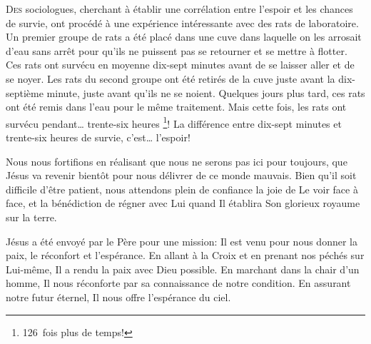 \dvrule







\lettrine{D}{es} sociologues, cherchant à établir une corrélation
 entre l'espoir et les chances de survie,
 ont procédé à une expérience intéressante
 avec des rats de laboratoire.
 Un premier groupe de rats a été placé dans une cuve
 dans laquelle on les arrosait d'eau sans arrêt
 pour qu'ils ne puissent pas se retourner et se mettre à flotter.
 Ces rats ont survécu en moyenne dix-sept minutes
 avant de se laisser aller et de se noyer.
 Les rats du second groupe ont été retirés de la cuve
 juste avant la dix-septième minute, juste avant qu'ils ne se noient.
 Quelques jours plus tard, ces rats ont été remis dans l'eau
 pour le même traitement.
 Mais cette fois, les rats ont survécu pendant\dots{} trente-six heures \footnote{126~fois plus de temps!}!
 La différence entre dix-sept minutes et trente-six heures de survie,
 c'est\dots{} l'espoir!


Nous nous fortifions en réalisant que nous ne serons pas ici pour toujours,
 que Jésus va revenir bientôt pour nous délivrer de ce monde mauvais.
 Bien qu'il soit difficile d'être patient, nous attendons plein de confiance
 la joie de Le voir face à face, et la bénédiction de régner avec Lui
 quand Il établira Son glorieux royaume sur la terre.

Jésus a été envoyé par le Père pour une mission:
 Il est venu pour nous donner la paix, le réconfort et l'espérance.
 En allant à la Croix et en prenant nos péchés sur Lui-même,
 Il a rendu la paix avec Dieu possible.
 En marchant dans la chair d'un homme,
 Il nous réconforte par sa connaissance de notre condition.
 En assurant notre futur éternel, Il nous offre l'espérance du ciel.

